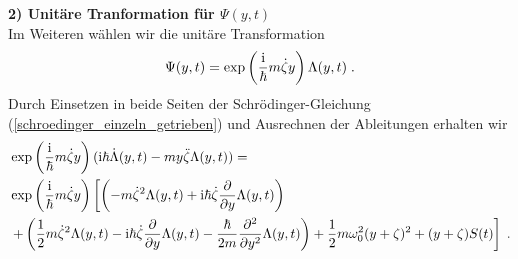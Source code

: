       \textbf{2) Unitäre Tranformation für $\Psi(y,t)$}\\
      Im Weiteren wählen wir die unitäre Transformation
      \begin{equation}
        \Psi(y,t) = \exp\left(\frac{\text i}{\hbar}m\dot \zeta y\right)\Lambda(y,t) \; .
      \end{equation}
      Durch Einsetzen in beide Seiten der Schrödinger-Gleichung (\ref{schroedinger_einzeln_getrieben}) und Ausrechnen der Ableitungen erhalten wir
      \begin{align}
        \begin{split}
          &\exp\left(\frac{\text i}{\hbar}m\dot \zeta y\right)(\text i \hbar \dot \Lambda(y,t) - my \ddot{\zeta}\Lambda(y,t)) =\\
           &\exp\left(\frac{\text i}{\hbar}m\dot \zeta y\right) \left[\left(-m\dot \zeta^2 \Lambda(y,t) + \text i \hbar \dot \zeta \frac{\partial}{\partial y} \Lambda(y,t) \right) \right. \\
           &\left. + \left(\frac{1}{2}m\dot \zeta^2 \Lambda(y,t) - \text{i} \hbar \dot \zeta \frac{\partial}{\partial y} \Lambda(y,t) - \frac{\hbar}{2m}\frac{\partial^2}{\partial y^2} \Lambda(y,t)  \right)
          + \frac{1}{2}m\omega_0^2(y+\zeta)^2  + (y+\zeta)S(t)  \right] \; .
        \end{split}
      \end{align}
      \iffalse
      Durch Einsetzen in die Schrödinger-Gleichung und Ausrechnen der Ableitungen erhalten wir für die linke Seite von (\ref{schroedinger_einzeln_getrieben})
      \text e^{\frac{\text i}{\hbar}m\dot \zeta y}(\text i \hbar \dot \Lambda(y,t) - my \ddot{\zeta}\Lambda(y,t))
      \begin{equation}
      \end{equation}
      und für die rechte Seite
      \begin{align}
        \begin{split}
        \text e^{\frac{\text i}{\hbar}m\dot \zeta y} \left[\left(-m\dot \zeta^2 \Lambda(y,t) + \text i \hbar \dot \zeta \frac{\partial}{\partial y} \Lambda(y,t) \right) + \left(\frac{1}{2}m\dot \zeta^2 \Lambda(y,t) - \text{i} \hbar \dot \zeta \frac{\partial}{\partial y} \Lambda(y,t) - \frac{\hbar}{2m}\frac{\partial^2}{\partial y^2} \Lambda(y,t)  \right) \right. \\
        \left. + \left(\frac{1}{2}m\omega_0^2y^2\Lambda(y,t) + m\omega_0^2y\zeta\Lambda(y,t) + \frac{1}{2}m\omega_0^2 \zeta^2\Lambda(y,t)) \right) + \left(-yS(t)\Lambda(y,t) - \zeta S(t)\Lambda(y,t) \right) \right]
      \end{split}
      \end{align}
      \fi

